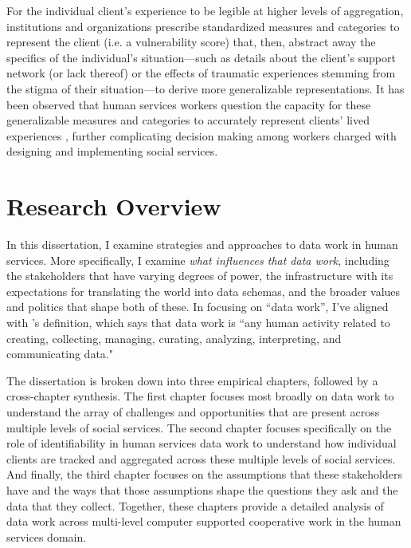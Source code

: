 For the individual client’s experience to be legible at higher levels of aggregation, institutions and organizations prescribe standardized measures and categories to represent the client (i.e. a vulnerability score) that, then, abstract away the specifics of the individual’s situation---such as details about the client’s support network (or lack thereof) or the effects of traumatic experiences stemming from the stigma of their situation---to derive more generalizable representations. It has been observed that human services workers question the capacity for these generalizable measures and categories to accurately represent clients’ lived experiences \citep{Schwalbe2004HS}, further complicating decision making among workers charged with designing and implementing social services.

\section{Research Overview}
In this dissertation, I examine strategies and approaches to data work in human services. More specifically, I examine \textit{what influences that data work}, including the stakeholders that have varying degrees of power, the infrastructure with its expectations for translating the world into data schemas, and the broader values and politics that shape both of these. In focusing on ``data work'', I've aligned with \citeauthor{Bossen2019Health}'s \citeyearpar{Bossen2019Health} definition, which says that data work is ``any human activity related to creating, collecting, managing, curating, analyzing, interpreting, and communicating data."

The dissertation is broken down into three empirical chapters, followed by a cross-chapter synthesis. The first chapter focuses most broadly on data work to understand the array of challenges and opportunities that are present across multiple levels of social services. The second chapter focuses specifically on the role of identifiability in human services data work to understand how individual clients are tracked and aggregated across these multiple levels of social services. And finally, the third chapter focuses on the assumptions that these stakeholders have and the ways that those assumptions shape the questions they ask and the data that they collect. Together, these chapters provide a detailed analysis of data work across multi-level computer supported cooperative work in the human services domain.

